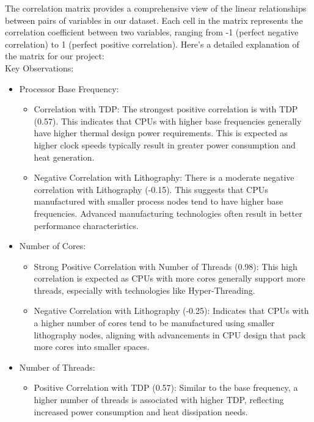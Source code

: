 The correlation matrix provides a comprehensive view of the linear relationships between pairs of variables in our dataset. Each cell in the matrix represents the correlation coefficient between two variables, ranging from -1 (perfect negative correlation) to 1 (perfect positive correlation). Here's a detailed explanation of the matrix for our project:\\[6pt]
Key Observations:
\begin{itemize}
    \item Processor Base Frequency:
    \begin{itemize}
        \item Correlation with TDP: The strongest positive correlation is with TDP (0.57). This indicates that CPUs with higher base frequencies generally have higher thermal design power requirements. This is expected as higher clock speeds typically result in greater power consumption and heat generation.
        \item Negative Correlation with Lithography: There is a moderate negative correlation with Lithography (-0.15). This suggests that CPUs manufactured with smaller process nodes tend to have higher base frequencies. Advanced manufacturing technologies often result in better performance characteristics.
    \end{itemize}
    
    \item Number of Cores:
    \begin{itemize}
        \item Strong Positive Correlation with Number of Threads (0.98): This high correlation is expected as CPUs with more cores generally support more threads, especially with technologies like Hyper-Threading.
        \item Negative Correlation with Lithography (-0.25): Indicates that CPUs with a higher number of cores tend to be manufactured using smaller lithography nodes, aligning with advancements in CPU design that pack more cores into smaller spaces.
    \end{itemize}
    
    \item Number of Threads:
    \begin{itemize}
        \item Positive Correlation with TDP (0.57): Similar to the base frequency, a higher number of threads is associated with higher TDP, reflecting increased power consumption and heat dissipation needs.
    \end{itemize}
    

\end{itemize}
